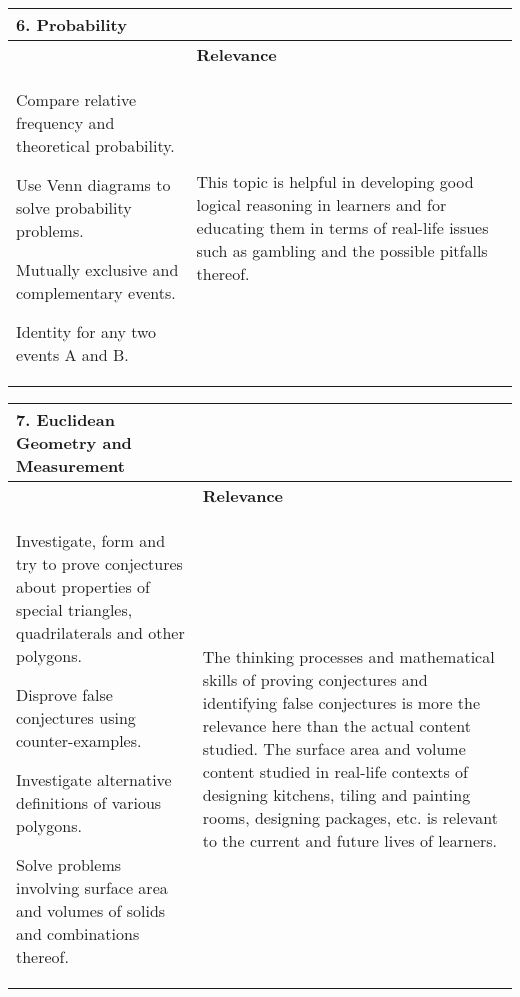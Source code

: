 \begin{table}[H]
 \begin{center} 
\begin{tabular}{|p{8.5cm}|p{3.5cm}|} \hline
\textbf{6. Probability}& \\ \hline  
&  \textbf{Relevance} \\ \hline
Compare relative frequency and theoretical probability.\par
Use Venn diagrams to solve probability problems.\par
Mutually exclusive and complementary events.\par
Identity for any two events A and B. \par
& This topic is helpful in developing good logical reasoning in learners and for educating them in terms of real-life issues such as gambling and the possible pitfalls thereof. 
\\ \hline

 \end{tabular}
\end{center}
\end{table}


\begin{table}[H]
 \begin{center} 
\begin{tabular}{|p{8.5cm}|p{3.5cm}|} \hline
\textbf{7. Euclidean Geometry and Measurement}& \\ \hline  
&  \textbf{Relevance} \\ \hline
Investigate, form and try to prove conjectures about properties of special triangles, quadrilaterals and other polygons.\par
Disprove false conjectures using counter-examples.\par
Investigate alternative definitions of various polygons.\par
Solve problems involving surface area and volumes of solids and combinations thereof.
& The thinking processes and mathematical skills of proving conjectures and identifying false conjectures is more the relevance here than the actual content studied. The surface area and volume content studied in real-life contexts of designing kitchens, tiling and painting rooms, designing packages, etc. is relevant to the current and future lives of learners. 
\\ \hline

 \end{tabular}
\end{center}
\end{table}

